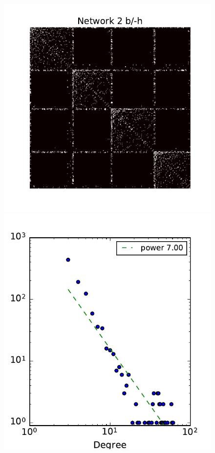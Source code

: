 \begin{figure}[h]
	\endminipage
	\vspace{-0.4cm}
	\includegraphics[scale=0.4]{img/g2}
	\endminipage
	\includegraphics[scale=0.4]{img/g2_d}

\end{figure}

